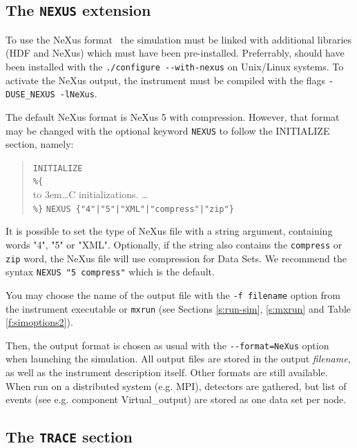 \subsection{The \texttt{NEXUS} extension}
   
\label{s:nexus}

To use the NeXus format~\cite{nexus_webpage} the simulation must be linked with additional libraries (HDF and NeXus) which must have been pre-installed. Preferrably, \MCX should
have been installed with the \verb+./configure --with-nexus+ on Unix/Linux systems. To activate the NeXus output, the instrument must be compiled with the flags
\verb+-DUSE_NEXUS -lNeXus+.

The default NeXus format is NeXus 5 with compression. However, that format may be changed with the optional keyword \verb+NEXUS+ to follow the INITIALIZE section, namely:

\begin{quote}
  \texttt{INITIALIZE} \\
  \verb|%{| \\
  \hbox to 3em{}\ldots C initializations. \ldots \\
  \verb|%}|
  \verb+NEXUS {"4"|"5"|"XML"|"compress"|"zip"}+
\end{quote}

It is possible to set the type of NeXus file with a string argument, containing words "4", "5" or "XML". Optionally, if the string also contains the \verb+compress+ or \verb+zip+
word, the NeXus file will use compression for Data Sets. We recommend the syntax \verb+NEXUS "5 compress"+ which is the default.

You may choose the name of the output file with the \verb+-f filename+ option from the instrument executable or \verb+mxrun+ (see Sections \ref{s:run-sim}, \ref{s:mxrun} and Table
\ref{f:simoptions2}).

Then, the output format is chosen as usual with the \verb+--format=NeXus+ option when launching the simulation. All output files are stored in the output \textit{filename}, as well
as the instrument description itself. Other formats are still available. When run on a distributed system (e.g. MPI), detectors are gathered, but list of events (see e.g. component
Virtual\_output) are stored as one data set per node.

\subsection{The \texttt{TRACE} section}
\label{s:trace}



